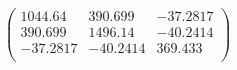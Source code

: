 \documentclass{article}
\begin{document}
\[\left(
\begin{array}{ccc}
 1044.64 & 390.699 & -37.2817 \\
 390.699 & 1496.14 & -40.2414 \\
 -37.2817 & -40.2414 & 369.433 \\
\end{array}
\right)\]
\end{document}
